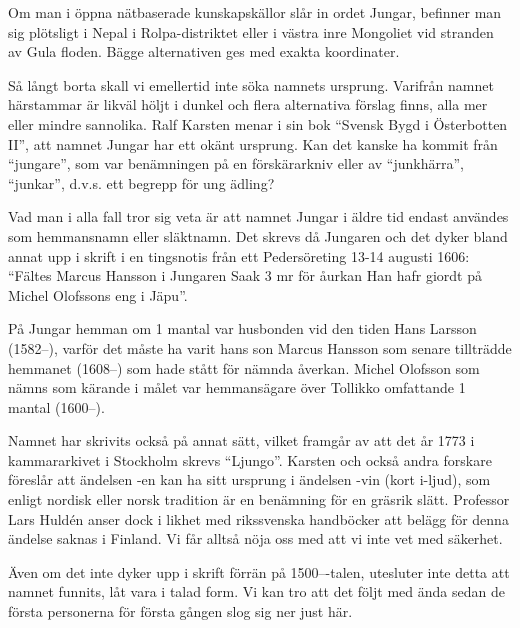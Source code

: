 %

%

Om man i öppna nätbaserade kunskapskällor slår in ordet Jungar, befinner man sig plötsligt i Nepal i Rolpa-distriktet eller  i västra inre Mongoliet vid stranden av Gula floden. Bägge alternativen ges med exakta koordinater.

Så långt borta skall vi emellertid inte söka namnets ursprung. Varifrån namnet härstammar är likväl höljt i dunkel och flera alternativa förslag finns, alla mer eller mindre sannolika. Ralf Karsten menar i sin bok ``Svensk Bygd i Österbotten II'', att namnet Jungar har ett okänt ursprung. Kan det kanske ha kommit från ``jungare'', som var benämningen på en förskärarkniv eller av ``junkhärra'', ``junkar'', d.v.s. ett begrepp för ung ädling?

Vad man i alla fall tror sig veta är att namnet Jungar i äldre tid endast användes som hemmansnamn eller släktnamn. Det skrevs då Jungaren och det dyker bland annat upp i skrift i en tingsnotis från ett Pedersöreting 13-14 augusti 1606: ``Fältes Marcus Hansson i Jungaren Saak 3 mr för åurkan Han hafr giordt på Michel Olofssons eng i Jäpu''.

På Jungar hemman om 1 mantal var husbonden vid den tiden Hans Larsson (1582--), varför det måste ha varit hans son Marcus Hansson som senare tillträdde hemmanet (1608--) som hade stått för nämnda åverkan. Michel Olofsson som nämns som kärande i målet var hemmansägare över Tollikko omfattande 1 mantal (1600--).

Namnet har skrivits också på annat sätt, vilket framgår av att det år 1773 i kammararkivet i Stockholm skrevs ``Ljungo''. Karsten och också andra forskare föreslår att ändelsen -en kan ha sitt ursprung i ändelsen -vin (kort i-ljud), som enligt nordisk eller norsk tradition är en benämning för en gräsrik slätt. Professor Lars Huldén anser dock i likhet med rikssvenska handböcker att belägg för denna ändelse saknas i Finland. Vi får alltså nöja oss med att vi inte vet med säkerhet.

Även om det inte dyker upp i skrift förrän på 1500---talen, utesluter inte detta att namnet funnits, låt vara i talad form. Vi kan tro att det följt med ända sedan de första personerna för första gången slog sig ner just här.

%

